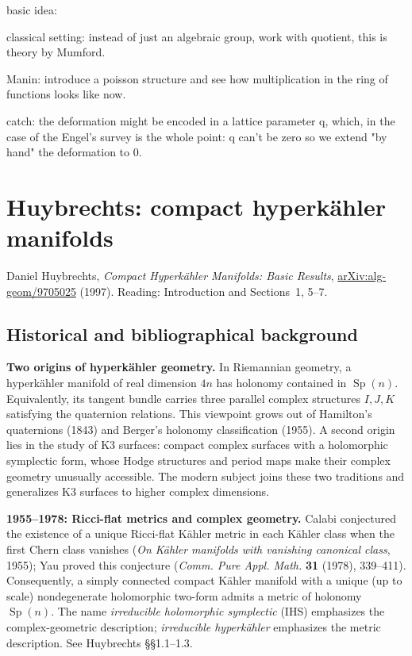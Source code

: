 \medskip\noindent
basic idea:

classical setting: instead of just an
algebraic group, work with quotient, this
is theory by Mumford.

Manin: introduce a poisson structure and
see how multiplication in the ring of
functions looks like now.

catch: the deformation might be encoded in
a lattice parameter q, which, in the case
of the Engel's survey is the whole point:
q can't be zero so we extend "by hand" the
deformation to 0.


\section{Huybrechts: compact hyperk\"ahler manifolds}
\label{section-huybrechts-hk-basic-results}

\noindent
Daniel Huybrechts, \emph{Compact Hyperk\"ahler Manifolds:
Basic Results}, \href{https://arxiv.org/abs/alg-geom/9705025}
{arXiv:alg-geom/9705025} (1997).
Reading: Introduction and Sections~1, 5--7.

\subsection{Historical and bibliographical background}
\label{subsection-huybrechts-history}

\noindent
\textbf{Two origins of hyperk\"ahler geometry.}
In Riemannian geometry, a hyperk\"ahler manifold
of real dimension $4n$ has holonomy contained in
$\operatorname{Sp}(n)$. Equivalently, its tangent
bundle carries three parallel complex structures
$I,J,K$ satisfying the quaternion relations.
This viewpoint grows out of Hamilton's quaternions
(1843) and Berger's holonomy classification (1955).
A second origin lies in the study of K3 surfaces:
compact complex surfaces with a holomorphic
symplectic form, whose Hodge structures and
period maps make their complex geometry unusually
accessible. The modern subject joins these two
traditions and generalizes K3 surfaces to higher
complex dimensions.

\par\smallskip\noindent
\textbf{1955--1978: Ricci-flat metrics and complex geometry.}
Calabi conjectured the existence of a unique
Ricci-flat K\"ahler metric in each K\"ahler class
when the first Chern class vanishes
(\emph{On K\"ahler manifolds with vanishing
canonical class}, 1955); Yau proved this
conjecture (\emph{Comm. Pure Appl. Math.}
\textbf{31} (1978), 339--411).
Consequently, a simply connected compact
K\"ahler manifold with a unique (up to scale)
nondegenerate holomorphic two-form admits
a metric of holonomy $\operatorname{Sp}(n)$.
The name \emph{irreducible holomorphic symplectic}
(IHS) emphasizes the complex-geometric description;
\emph{irreducible hyperk\"ahler} emphasizes the metric
description. See Huybrechts \S\S1.1--1.3.

